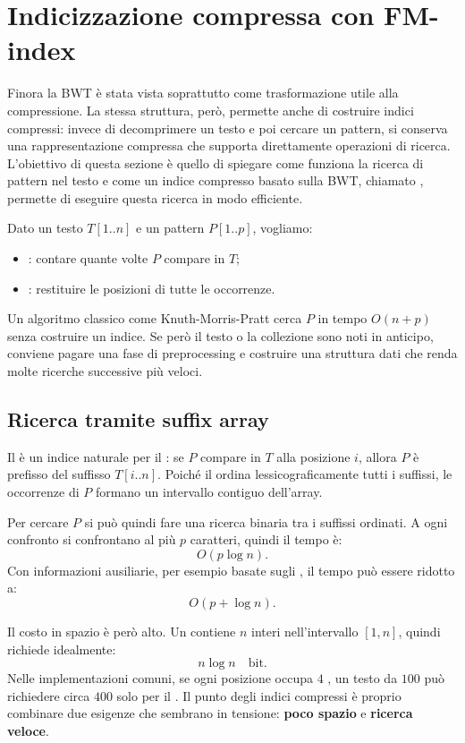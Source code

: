 \documentclass{article}
\theoremstyle{definition}
\numberwithin{equation}{section}
\begin{document}
\section{Indicizzazione compressa con FM-index}
Finora la BWT è stata vista soprattutto come trasformazione utile alla compressione. La stessa struttura, però, permette anche di costruire indici compressi: invece di decomprimere un testo e poi cercare un pattern, si conserva una rappresentazione compressa che supporta direttamente operazioni di ricerca. L'obiettivo di questa sezione è quello di spiegare come funziona la ricerca di pattern nel testo e come un indice compresso basato sulla BWT, chiamato \textbf{}, permette di eseguire questa ricerca in modo efficiente.

Dato un testo $T[1..n]$ e un pattern $P[1..p]$, vogliamo:
\begin{itemize}
    \item \textbf{}: contare quante volte $P$ compare in $T$;
    \item \textbf{}: restituire le posizioni di tutte le occorrenze.
\end{itemize}

Un algoritmo classico come Knuth-Morris-Pratt cerca $P$ in tempo $O(n+p)$ senza costruire un indice. Se però il testo o la collezione sono noti in anticipo, conviene pagare una fase di preprocessing e costruire una struttura dati che renda molte ricerche successive più veloci.

\subsection{Ricerca tramite suffix array}
Il  è un indice naturale per il : se $P$ compare in $T$ alla posizione $i$, allora $P$ è prefisso del suffisso $T[i..n]$. Poiché il  ordina lessicograficamente tutti i suffissi, le occorrenze di $P$ formano un intervallo contiguo dell'array.

Per cercare $P$ si può quindi fare una ricerca binaria tra i suffissi ordinati. A ogni confronto si confrontano al più $p$ caratteri, quindi il tempo è:
\[
    O(p\log n).
\]
Con informazioni ausiliarie, per esempio basate sugli , il tempo può essere ridotto a:
\[
    O(p+\log n).
\]

Il costo in spazio è però alto. Un  contiene $n$ interi nell'intervallo $[1,n]$, quindi richiede idealmente:
\[
    n\log n
    \quad
    \text{bit}.
\]
Nelle implementazioni comuni, se ogni posizione occupa $4$ , un testo da $100$  può richiedere circa $400$  solo per il . Il punto degli indici compressi è proprio combinare due esigenze che sembrano in tensione: \textbf{poco spazio} e \textbf{ricerca veloce}.
\end{document}
